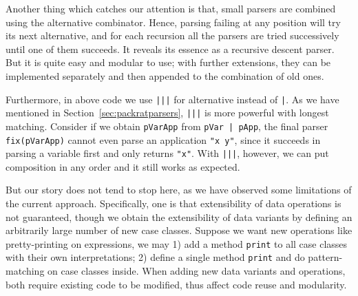 Another thing which catches our attention is that, small parsers are combined using the alternative combinator. Hence, parsing failing at any position will try its next alternative, and for each recursion all the parsers are tried successively until one of them succeeds. It reveals its essence as a recursive descent parser. But it is quite easy and modular to use; with further extensions, they can be implemented separately and then appended to the combination of old ones.

Furthermore, in above code we use \lstinline{|||} for alternative instead of \lstinline{|}. As we have mentioned in Section~\ref{sec:packratparsers}, \lstinline{|||} is more powerful with longest matching. Consider if we obtain \lstinline{pVarApp} from \lstinline{pVar | pApp}, the final parser \lstinline{fix(pVarApp)} cannot even parse an application \lstinline{"x y"}, since it succeeds in parsing a variable first and only returns \lstinline{"x"}. With \lstinline{|||}, however, we can put composition in any order and it still works as expected.

But our story does not tend to stop here, as we have observed some limitations of the current approach. Specifically, one is that extensibility of data operations is not guaranteed, though we obtain the extensibility of data variants by defining an arbitrarily large number of new case classes. Suppose we want new operations like pretty-printing on expressions, we may 1) add a method \lstinline{print} to all case classes with their own interpretations; 2) define a single method \lstinline{print} and do pattern-matching on case classes inside. When adding new data variants and operations, both require existing code to be modified, thus affect code reuse and modularity.

